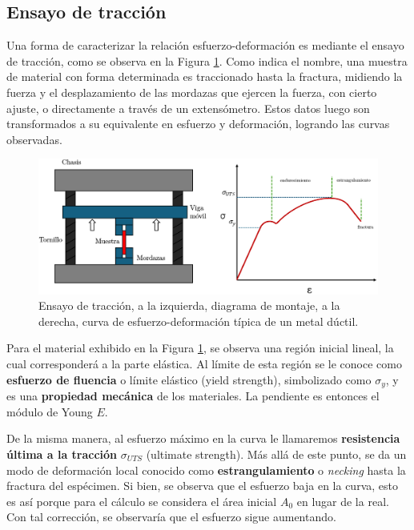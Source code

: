 \subsection{Ensayo de tracción}

Una forma de caracterizar la relación esfuerzo-deformación es mediante el ensayo de tracción, como se observa en la Figura \ref{fig:2}. Como indica el nombre, una muestra de material con forma determinada es traccionado hasta la fractura, midiendo la fuerza y el desplazamiento de las mordazas que ejercen la fuerza, con cierto ajuste, o directamente a través de un extensómetro. Estos datos luego son transformados a su equivalente en esfuerzo y deformación, logrando las curvas observadas. 

\begin{figure}[h!]
    \centering
    \includegraphics[width=0.97\linewidth]{imgs/es1.png}
    \caption{Ensayo de tracción, a la izquierda, diagrama de montaje, a la derecha, curva de esfuerzo-deformación típica de un metal dúctil.}
    \label{fig:2}
\end{figure}

Para el material exhibido en la Figura \ref{fig:2}, se observa una región inicial lineal, la cual corresponderá a la parte elástica. Al límite de esta región se le conoce como \textbf{esfuerzo de fluencia} o límite elástico (yield strength), simbolizado como $\sigma_{y}$, y es una \textbf{propiedad mecánica} de los materiales. La pendiente es entonces el módulo de Young $E$.

De la misma manera, al esfuerzo máximo en la curva le llamaremos \textbf{resistencia última a la tracción} $\sigma_{UTS}$ (ultimate strength). Más allá de este punto, se da un modo de deformación local conocido como \textbf{estrangulamiento} o \textit{necking} hasta la fractura del espécimen. Si bien, se observa que el esfuerzo baja en la curva, esto es así porque para el cálculo se considera el área inicial $A_{0}$ en lugar de la real. Con tal corrección, se observaría que el esfuerzo sigue aumentando.

